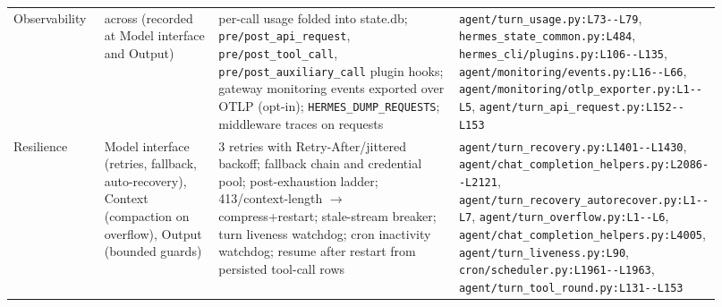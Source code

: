 \begin{longtable}{@{}p{0.13\linewidth}p{0.17\linewidth}p{0.36\linewidth}p{0.26\linewidth}@{}}
Observability & across (recorded at Model interface and Output) & per-call usage folded into state.db; \texttt{pre/\allowbreak{}post\_\allowbreak{}api\_\allowbreak{}request}, \texttt{pre/\allowbreak{}post\_\allowbreak{}tool\_\allowbreak{}call}, \texttt{pre/\allowbreak{}post\_\allowbreak{}auxiliary\_\allowbreak{}call} plugin hooks; gateway monitoring events exported over OTLP (opt-in); \texttt{HERMES\_\allowbreak{}DUMP\_\allowbreak{}REQUESTS}; middleware traces on requests & \texttt{agent/\allowbreak{}turn\_\allowbreak{}usage.\allowbreak{}py:\allowbreak{}L73-\allowbreak{}-\allowbreak{}L79}, \texttt{hermes\_\allowbreak{}state\_\allowbreak{}common.\allowbreak{}py:\allowbreak{}L484}, \texttt{hermes\_\allowbreak{}cli/\allowbreak{}plugins.\allowbreak{}py:\allowbreak{}L106-\allowbreak{}-\allowbreak{}L135}, \texttt{agent/\allowbreak{}monitoring/\allowbreak{}events.\allowbreak{}py:\allowbreak{}L16-\allowbreak{}-\allowbreak{}L66}, \texttt{agent/\allowbreak{}monitoring/\allowbreak{}otlp\_\allowbreak{}exporter.\allowbreak{}py:\allowbreak{}L1-\allowbreak{}-\allowbreak{}L5}, \texttt{agent/\allowbreak{}turn\_\allowbreak{}api\_\allowbreak{}request.\allowbreak{}py:\allowbreak{}L152-\allowbreak{}-\allowbreak{}L153} \\
Resilience & Model interface (retries, fallback, auto-recovery), Context (compaction on overflow), Output (bounded guards) & 3 retries with Retry-After/jittered backoff; fallback chain and credential pool; post-exhaustion ladder; 413/context-length $\rightarrow$ compress+restart; stale-stream breaker; turn liveness watchdog; cron inactivity watchdog; resume after restart from persisted tool-call rows & \texttt{agent/\allowbreak{}turn\_\allowbreak{}recovery.\allowbreak{}py:\allowbreak{}L1401-\allowbreak{}-\allowbreak{}L1430}, \texttt{agent/\allowbreak{}chat\_\allowbreak{}completion\_\allowbreak{}helpers.\allowbreak{}py:\allowbreak{}L2086-\allowbreak{}-\allowbreak{}L2121}, \texttt{agent/\allowbreak{}turn\_\allowbreak{}recovery\_\allowbreak{}autorecover.\allowbreak{}py:\allowbreak{}L1-\allowbreak{}-\allowbreak{}L7}, \texttt{agent/\allowbreak{}turn\_\allowbreak{}overflow.\allowbreak{}py:\allowbreak{}L1-\allowbreak{}-\allowbreak{}L6}, \texttt{agent/\allowbreak{}chat\_\allowbreak{}completion\_\allowbreak{}helpers.\allowbreak{}py:\allowbreak{}L4005}, \texttt{agent/\allowbreak{}turn\_\allowbreak{}liveness.\allowbreak{}py:\allowbreak{}L90}, \texttt{cron/\allowbreak{}scheduler.\allowbreak{}py:\allowbreak{}L1961-\allowbreak{}-\allowbreak{}L1963}, \texttt{agent/\allowbreak{}turn\_\allowbreak{}tool\_\allowbreak{}round.\allowbreak{}py:\allowbreak{}L131-\allowbreak{}-\allowbreak{}L153} \\

\end{longtable}

